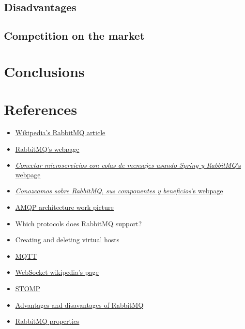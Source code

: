 \documentclass[12pt]{article}
\begin{document}
\subsection*{Disadvantages}

\subsection*{Competition on the market}

\section*{Conclusions}

\section*{References}
\begin{itemize}
    \item \href{https://en.wikipedia.org/wiki/RabbitMQ}{\underline{Wikipedia's RabbitMQ article}}
    \item \href{https://www.rabbitmq.com}{\underline{RabbitMQ's webpage}}
    \item \href{https://www.sdos.es/blog/microservicios-mensajes-spring-rabbitmq}{\underline{\textit{Conectar microservicios con colas de mensajes usando Spring y RabbitMQ}'s webpage}}
    \item \href{https://www.pragma.com.co/academia/lecciones/conozcamos-sobre-rabbitmq-sus-componentes-y-beneficios}{\underline{\textit{Conozcamos sobre RabbitMQ, sus componentes y beneficios}'s webpage}}
    \item \href{https://www.researchgate.net/publication/325119432/figure/fig5/AS:626093459505153@1526283721309/AMQP-architecture-34.png}{\underline{AMQP architecture work picture}}
    \item \href{https://www.rabbitmq.com/protocols.html}{\underline{Which protocols does RabbitMQ support?}}
    \item \href{https://www.rabbitmq.com/vhosts.html}{\underline{Creating and deleting virtual hosts}}
    \item \href{https://www.luisllamas.es/que-es-mqtt-su-importancia-como-protocolo-iot/}{\underline{MQTT}}
    \item \href{https://en.wikipedia.org/wiki/WebSocket}{\underline{WebSocket wikipedia's page}}
    \item \href{http://stomp.github.io}{\underline{STOMP}}
    \item \href{https://programmerclick.com/article/80671335987/}{\underline{Advantages and disavantages of RabbitMQ}}
\item \href{https://blog.devgenius.io/scalable-system-implementation-using-rabbitmq-java-and-mysql-2d5fe0fa182e}{\underline{RabbitMQ properties}}
    \end{itemize}
\end{document}
